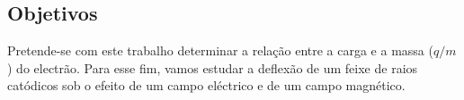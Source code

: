 \begin{center}
\begin{minipage}[c][3cm][c]{\textwidth}
\begin{center}
\section*{\centering Objetivos}
    \vspace{-3mm}
\small
\justify
Pretende-se com este trabalho determinar a relação entre a carga e a massa ($q/m$) do electrão. Para esse fim, vamos
estudar a deflexão de um feixe de raios catódicos sob o efeito de um campo eléctrico e de um campo magnético.

    
\end{center}
\hline


\end{minipage}
\begin{minipage}[c][2cm][c]{\textwidth}
\centering

\end{minipage}

\end{center}